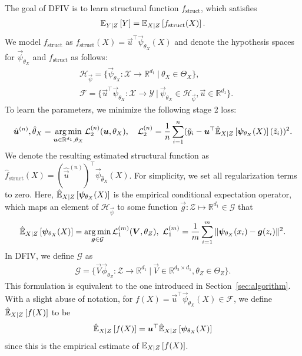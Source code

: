 The goal of DFIV is to learn structural function $f_\mathrm{struct}$, which satisfies
\begin{align}
    \expect[Y|Z]{Y} = \expect[X|Z]{f_\mathrm{struct}(X)}. \label{eq:functional}
\end{align}
We model $f_\mathrm{struct}$ as $f_\mathrm{struct}(X) = \vec{u}^\top \vec{\psi}_{\theta_X}(X)$ and denote the hypothesis spaces for $\vec{\psi}_{\theta_X}$ and $f_\mathrm{struct}$ as follows:
\begin{align*}
    &\mathcal{H}_{\vec{\psi}} = \{\vec{\psi}_{\theta_X}: \mathcal{X} \to \mathbb{R}^{d_1}~|~ \theta_X \in \Theta_X\},\\
    &\mathcal{F} = \{\vec{u}^\top \vec{\psi}_{\theta_X}: \mathcal{X} \to \mathcal{Y}~|~\vec{\psi}_{\theta_X} \in \mathcal{H}_{\vec{\psi}}, \vec{u} \in \mathbb{R}^{d_1}\}.
\end{align*} 
To learn the parameters, we minimize the following stage 2 loss:
\begin{align*}
    \hat{\vec{u}}^{(n)}, \hat{\theta}_X = \argmin_{\vec{u} \in \mathbb{R}^{d_1}, \theta_X}\mathcal{L}^{(n)}_2(\vec{u},\theta_X), \quad \mathcal{L}^{(n)}_2 = \frac1n \sum_{i=1}^n (\tilde y_i - \vec{u}^\top \hatexpect[X|Z]{\vec{\psi}_{\theta_X}(X)}(\tilde z_i))^2.
\end{align*}
We denote the resulting estimated structural function as $\hat{f}_{\mathrm{struct}}(X) = (\hat{\vec{u}}^{(n)})^\top \vec{\psi}_{\hat{\theta}_X}(X)$. For simplicity, we set all regularization terms  to zero. Here, $\hatexpect[X|Z]{\vec{\psi}_{\theta_X}(X)}$ is the empirical conditional expectation operator, which maps an element of $\mathcal{H}_{\vec{\psi}}$ to some function $\vec{g}: \mathcal{Z} \mapsto \mathbb{R}^{d_1} \in \mathcal{G}$ that
\begin{align*}
    \hatexpect[X|Z]{\vec{\psi}_{\theta_X}(X)} = \argmin_{\vec{g} \in \mathcal{G}} \mathcal{L}_1^{(m)}(\vec{V}, \theta_Z),~ \mathcal{L}_1^{(m)} = \frac1m \sum_{i=1}^m \|\vec{\psi}_{\theta_X}(x_i) - \vec{g}(z_i)\|^2. 
\end{align*}
In DFIV, we define $\mathcal{G}$  as
\begin{align*}
    \mathcal{G} = \{\vec{V} \vec{\phi}_{\theta_Z}:\mathcal{Z}\to\mathbb{R}^{d_1}~|~ \vec{V} \in \mathbb{R}^{d_2 \times d_1}, \theta_Z \in \Theta_Z\}.
\end{align*}
This formulation is equivalent to the one introduced in Section~\ref{sec:algorithm}. With a slight abuse of notation, for $f(X) = \vec{u}^\top \vec{\psi}_{\theta_X}(X) \in \mathcal{F}$, we define $\hatexpect[X|Z]{f(X)}$ to be
\begin{align*}
    \hatexpect[X|Z]{f(X)} = \vec{u}^\top \hatexpect[X|Z]{\vec{\psi}_{\theta_X}(X)}
\end{align*}
since this is the empirical estimate of $\expect[X|Z]{f(X)}$.

